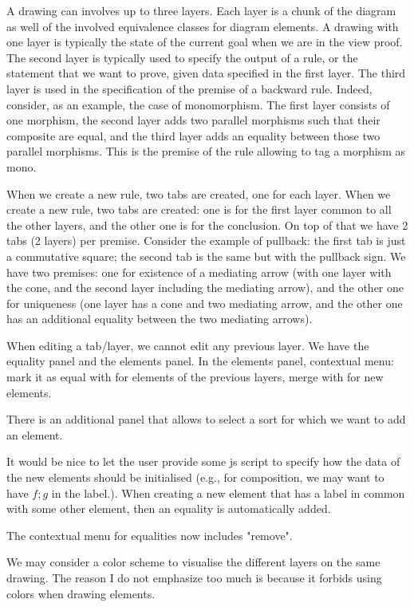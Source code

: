 \documentclass{article}
\begin{document}
A drawing can involves up to three layers. Each layer is a chunk of the diagram as well of the involved equivalence classes for diagram elements.
A drawing with one layer is typically the state of the current goal when we are in the view proof. The second layer is typically used to specify the output of a 
 rule, or the statement that we want to prove, given data specified in the first layer. The third layer is used in the specification of the premise of a backward rule. Indeed, consider, as an example, the case of monomorphism. The first layer consists of one morphism, the second layer adds two parallel morphisms such that their composite are equal, and the third layer adds an equality between those two parallel  morphisms. This is the premise of the  rule allowing to tag a morphism as mono.

When we create a new  rule, two tabs are created, one for each layer.
When we create a new  rule, two tabs are created: one is for the first layer common to all the other layers, and the other one is for the conclusion.
On top of that we have 2 tabs (2 layers) per premise. Consider the example of pullback: the first tab is just a commutative square; the second tab is the same but with the pullback sign. We have two premises: one for existence of a mediating arrow (with one layer with the cone, and the second layer including the mediating arrow), and the other one for uniqueness (one layer has a cone and two mediating arrow, and the other one has an additional equality between the two mediating arrows). 

When editing a tab/layer, we cannot edit any previous layer.
 We have the equality panel and the elements panel.
In the elements panel, contextual menu: mark it as equal with for elements of the previous layers, merge with for new elements.

There is an additional panel that allows to select a sort for which we want to add an element.

It would be nice to let the user provide some js script to specify how the data of the new elements should be initialised (e.g., for composition, we may want to have $f ; g$ in the label.). When creating a new element that has a label in common with some other element, then an equality is automatically added.

The contextual menu for equalities now includes "remove".

We may consider a color scheme to visualise the different layers on the same drawing. The reason I do not emphasize too much is because it forbids using colors when drawing elements.
 
\end{document}
